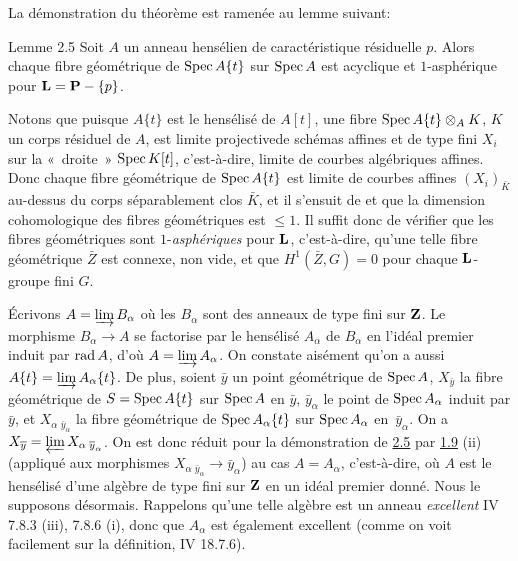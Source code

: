\documentclass[10pt]{../fichiers-configuration-latex/smfart}
\begin{document}
La démonstration du théorème est ramenée au lemme suivant:

\begin{enonce*}{Lemme 2.5}
Soit $A$ un anneau hensélien de caractéristique résiduelle $p$. Alors
chaque fibre géométrique de $\Spec A\{t\}$ sur $\Spec A$ est acyclique
et $1$-asphérique pour $\LL=\PP-\{p\}$.
\end{enonce*}

Notons que puisque $A\{t\}$ est le hensélisé de $A[t]$, une fibre
$\Spec A\{t\}\otimes_A K$, $K$ un corps résiduel de $A$, est limite
projective\pageoriginale de schémas affines et de type fini $X_i$ sur
la « droite »  $\Spec K[t]$, c'est-à-dire, limite de courbes
algébriques affines. Donc chaque fibre géométrique de $\Spec A\{t\}$
est limite de courbes affines $(X_i)_{\bar{K}}$ au-dessus du corps
séparablement clos $\bar{K}$, et il s'ensuit de  et 
que la dimension cohomologique des fibres géométriques est $\leq 1$. Il
suffit donc de vérifier que les fibres géométriques sont
$1$-\emph{asphériques} pour $\LL$, c'est-à-dire, qu'une telle
fibre géométrique $\bar{Z}$ est connexe, non vide, et que
$H^{1}(\bar{Z},G)=0$ pour chaque $\LL$-groupe fini $G$.

Écrivons $A=\varinjlim B_{\alpha}$ où les $B_{\alpha}$ sont des
anneaux de type fini sur $\ZZ$. Le morphisme
$B_{\alpha}\rightarrow A$ se factorise par le hensélisé $A_{\alpha}$
de $B_{\alpha}$ en l'idéal premier induit par $\rad A$, d'où
$A=\varinjlim A_{\alpha}$. On constate aisément qu'on a aussi
$A\{t\}=\varinjlim A_{\alpha}\{t\}$. De plus, soient $\bar{y}$ un
point géométrique de $\Spec A$, $X_{\bar{y}}$ la fibre géométrique de
$S=\Spec A\{t\}$ sur $\Spec A$ en $\bar{y}$, $\bar{y}_{\alpha}$ le
point de $\Spec A_{\alpha}$ induit par $\bar{y}$, et
$X_{\alpha}\,_{\bar{y}_{\alpha}}$ %
la fibre géométrique de $\Spec A_{\alpha}\{t\}$ sur $\Spec A_{\alpha}$ en~$\bar{y}_{\alpha}$. On a
$X_{\bar{y}}=\varprojlim {X_{\alpha}}\,_{\bar{y}_{\alpha}}$. On est donc
réduit pour la démonstration de \hyperref[XV.lem2.5]{2.5} par \hyperref[XV.prop1.9]{1.9} (ii) (appliqué aux
morphismes $X_{\alpha}\,_{\bar{y}_{\alpha}}\rightarrow \bar{y}_{\alpha}$)
au cas $A=A_{\alpha}$, c'est-à-dire, où $A$ est le hensélisé d'une
algèbre de type fini sur $\ZZ$ en un idéal premier donné. Nous
le supposons désormais. Rappelons qu'une telle algèbre est un anneau
\emph{excellent} \sisi{(}{}\EGA IV 7.8.3 (iii), 7.8.6 (i)\sisi{)}{}, donc que $A_{\alpha}$
est également excellent (comme on voit facilement sur la définition,
\cf \EGA IV 18.7.6).
\end{document}
